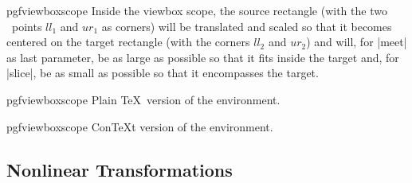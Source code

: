 \begin{environment}{{pgfviewboxscope}}
    Inside the viewbox scope, the source rectangle (with the two \pgfname\
    points $ll_1$ and $ur_1$ as corners) will be translated and scaled so that
    it becomes centered on the target rectangle (with the corners $ll_2$ and
    $ur_2$) and will, for |meet| as last parameter, be as large as possible so
    that it fits inside the target and, for |slice|, be as small as possible so
    that it encompasses the target.
\begin{codeexample}[]
\end{codeexample}
\begin{codeexample}[]
\end{codeexample}
\end{environment}

\begin{plainenvironment}{{pgfviewboxscope}}
    Plain \TeX\ version of the environment.
\end{plainenvironment}

\begin{contextenvironment}{{pgfviewboxscope}}
    Con\TeX t version of the environment.
\end{contextenvironment}


\subsection{Nonlinear Transformations}
\label{section-nonlinear-transformations}

